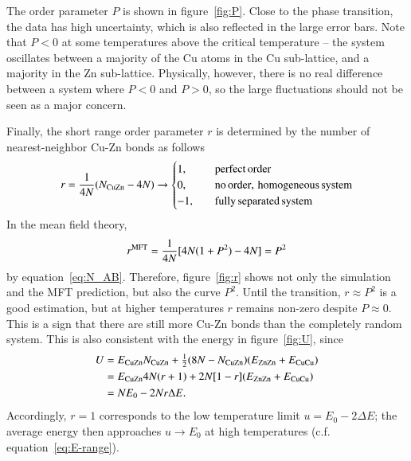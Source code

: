 The order parameter $P$ is shown in figure~\ref{fig:P}. Close to the
phase transition, the data has high uncertainty, which is also
reflected in the large error bars. Note that $P<0$ at some
temperatures above the critical temperature -- the system oscillates
between a majority of the Cu atoms in the Cu sub-lattice, and a
majority in the Zn sub-lattice. Physically, however, there is no real
difference between a system where $P<0$ and $P>0$, so the large
fluctuations should not be seen as a major concern.

Finally, the short range order parameter $r$ is determined by the number of nearest-neighbor Cu-Zn bonds as follows
\begin{equation}
r = \frac{1}{4 N}(N_{\rm CuZn}-4N) \rightarrow \begin{cases}
1, \quad& {\rm perfect \, order} \\
0, \quad&  {\rm no \, order, \, homogeneous \, system}\\
-1, \quad& {\rm fully \, separated \, system}
\end{cases}
\end{equation}
In the mean field theory, 
\begin{equation}
r^{\rm MFT} = \frac{1}{4 N}[4N(1+P^2)-4N] = P^2
\end{equation}
by equation~\eqref{eq:N_AB}. Therefore, figure~\ref{fig:r} shows not only the simulation and the MFT prediction, but also the curve $P^2$. Until the transition, $r \approx P^2$ is a good estimation, but at higher temperatures $r$ remains non-zero despite $P \approx 0$. This is a sign that there are still more Cu-Zn bonds than the completely random system. This is also consistent with the energy in figure~\ref{fig:U}, since 
\begin{align}
U &= E_{\rm CuZn}N_{\rm CuZn}
+ \tfrac{1}{2}(8N - N_{\rm CuZn}) ( E_{\rm ZnZn} + E_{\rm CuCu})
\\ &=
 E_{\rm CuZn}4N(r+1)
+ 2N [1 - r] ( E_{\rm ZnZn} + E_{\rm CuCu})  
\\ &=
N E_0   - 2N r \Delta E .
\end{align}
Accordingly, $r = 1$ corresponds to the low temperature limit $u = E_0 -2\Delta E$; the average energy then approaches $u \rightarrow E_0$ at high temperatures (c.f. equation~\eqref{eq:E-range}).   

